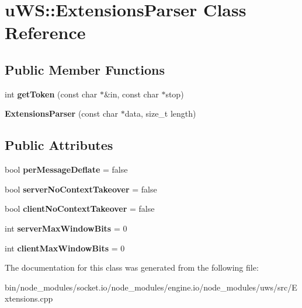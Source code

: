 \hypertarget{classu_w_s_1_1_extensions_parser}{}\section{u\+WS\+:\+:Extensions\+Parser Class Reference}
\label{classu_w_s_1_1_extensions_parser}
\subsection*{Public Member Functions}
\begin{DoxyCompactItemize}
\item 
\mbox{\label{classu_w_s_1_1_extensions_parser_abbebc380ffbcee1ccf067640609f3e99}} 
int {\bfseries get\+Token} (const char $\ast$\&in, const char $\ast$stop)
\item 
\mbox{\label{classu_w_s_1_1_extensions_parser_a53abb329ad87399078c2b3d0d8249a24}} 
{\bfseries Extensions\+Parser} (const char $\ast$data, size\+\_\+t length)
\end{DoxyCompactItemize}
\subsection*{Public Attributes}
\begin{DoxyCompactItemize}
\item 
\mbox{\label{classu_w_s_1_1_extensions_parser_a9b130181641c64f8218480b3c8e3e829}} 
bool {\bfseries per\+Message\+Deflate} = false
\item 
\mbox{\label{classu_w_s_1_1_extensions_parser_a9cc56cf733b0a77d3735be9748b2405c}} 
bool {\bfseries server\+No\+Context\+Takeover} = false
\item 
\mbox{\label{classu_w_s_1_1_extensions_parser_aea69ec5ecae7e06f6a9161ceff4bd63a}} 
bool {\bfseries client\+No\+Context\+Takeover} = false
\item 
\mbox{\label{classu_w_s_1_1_extensions_parser_a0e2290a323fd8b478dbbe9604f2f81e2}} 
int {\bfseries server\+Max\+Window\+Bits} = 0
\item 
\mbox{\label{classu_w_s_1_1_extensions_parser_a73a23fa8d0bbf4400450dbb8bfa4884c}} 
int {\bfseries client\+Max\+Window\+Bits} = 0
\end{DoxyCompactItemize}


The documentation for this class was generated from the following file\+:\begin{DoxyCompactItemize}
\item 
bin/node\+\_\+modules/socket.\+io/node\+\_\+modules/engine.\+io/node\+\_\+modules/uws/src/Extensions.\+cpp\end{DoxyCompactItemize}
